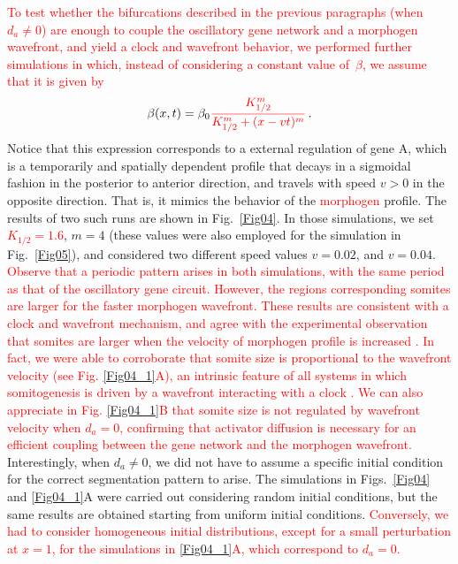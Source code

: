 \documentclass[%
 preprint,
 aip, 
 amsmath,amssymb,
]{revtex4-2}
\begin{document}
\textcolor{red}{To test whether the bifurcations described in the previous paragraphs (when $d_a \neq 0$) are enough to couple the oscillatory gene network and a morphogen wavefront, and yield a clock and wavefront behavior, we performed further simulations in which, instead of considering a constant value of~$\beta$, we assume that it is given by} 
	\begin{gather}\label{eqbeta}
	\beta(x, t) = \beta_0 \textcolor{red}{\frac{K_{1/2}^m}{K_{1/2}^m + (x - v t)^m}}\,.
	\end{gather}
Notice that this expression corresponds to a external regulation of gene A, which is a temporarily and spatially dependent profile that decays in a sigmoidal fashion in the posterior to anterior direction, and travels with speed $v>0$ in the opposite direction. That is, it mimics the behavior of the \textcolor{red}{morphogen} profile. The results of two such runs are shown in Fig.~\ref{Fig04}. In those simulations, we set \textcolor{red}{$K_{1/2} =1.6 $}, $m = 4 $ (these values were also employed for the simulation in Fig.~\ref{Fig05}), and considered two different speed values $v = 0.02 $, and $v = 0.04$. \textcolor{red}{Observe that a periodic pattern arises in both simulations, with the same period as that of the oscillatory gene circuit. However, the regions corresponding somites are larger for the faster morphogen wavefront. These results are consistent with a clock and wavefront mechanism, and agree with the experimental observation that somites are larger when the velocity of \textcolor{red}{morphogen} profile is increased \cite{Sawada2001}. In fact, we were able to corroborate that somite size is proportional to the wavefront velocity (see Fig. \ref{Fig04_1}A), an intrinsic feature of all systems in which somitogenesis is driven by a wavefront interacting with a clock \cite{Morelli2009}. We can also appreciate  in Fig. \ref{Fig04_1}B that somite size is not regulated by wavefront velocity when $d_a=0$, confirming that activator diffusion is necessary for an efficient coupling between the gene network and the morphogen wavefront.} Interestingly, when $d_a \neq 0$, we did not have to  assume a specific initial condition for the correct segmentation pattern to arise. The simulations in Figs.~\ref{Fig04} and \ref{Fig04_1}A were carried out considering random initial conditions, but the same results are obtained starting from uniform initial conditions. \textcolor{red}{Conversely, we had to consider homogeneous initial distributions, except for a small perturbation at $x=1$, for the simulations in \ref{Fig04_1}A, which correspond to $d_a=0$.}
\end{document}

